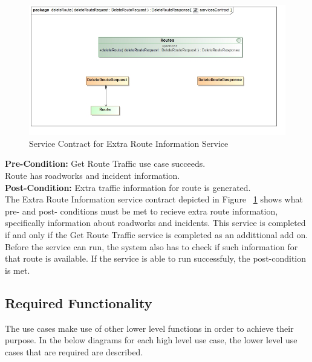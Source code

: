 \documentclass[a4paper,12pt]{article}
\begin{document}
\begin{figure}[ht]
\includegraphics[width=\textwidth]{images/scDelete_Route.jpg}
\caption{Service Contract for Extra Route Information Service}
\label{fig:sc_extra}
\end{figure}

\textbf{Pre-Condition: }
Get Route Traffic use case succeeds.\\
Route has roadworks and incident information.\\
\textbf{Post-Condition: }
Extra traffic information for route is generated.\\

The Extra Route Information service contract depicted in Figure ~\ref{fig:sc_extra} shows what pre- and post- conditions must be met to recieve extra route information, specifically information about roadworks and incidents. This service is completed if and only if the Get Route Traffic service is completed as an addittional add on. Before the service can run, the system also has to check if such information for that route is available. If the service is able to run successfuly, the post-condition is met.

\subsection{Required Functionality}
The use cases make use of other lower level functions in order to achieve their purpose. In the below diagrams for each high level use case, the lower level use cases that are required are described.
\end{document}
